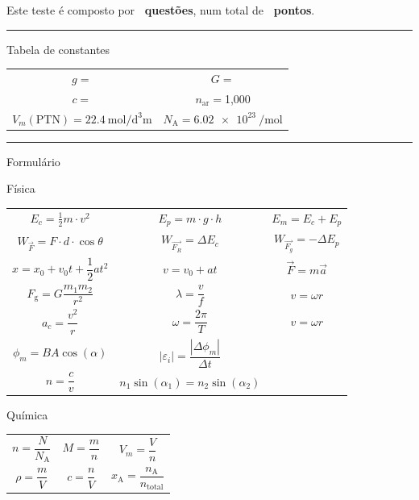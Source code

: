 \vspace{0.5cm}
Este teste é composto por \textbf{\numquestions\ questões}, num total de \textbf{\numpoints\ pontos}.

\par\noindent\rule{\textwidth}{0.4pt}

\vspace{10pt}
{\Large Tabela de constantes}

\begin{center}
	\begin{tabular}{c|c}
		
		$g = $ \kAccelGravity & $ G = $ \kGravity \\
		 $c = $ \kSpeedLight & $n_\text{ar} = $1,000\\
		 $V_m(\text{PTN}) = \SI{22,4}{\mole\per\cubic\deci\meter}$ & $N_\text{A} = \SI{6,02e23}{\per\mole}$\\
		
	\end{tabular}
\end{center}

\par\noindent\rule{\textwidth}{0.4pt}

\vspace{10pt}
{\Large Formulário}

\begin{center}
	Física\\
	\begin{tabular}{|ccc|}
		
		\hline
		$E_c = \frac{1}{2} m \cdot v^2$ & $ E_p = m \cdot g \cdot h $ & $E_m = E_c + E_p$\\
		$W_{\vec{F}} = F \cdot d \cdot \cos \theta$ & $W_{\vec{F_R}} = \Delta E_c$ & $W_{\vec{F_g}} = - \Delta E_p$\\
		$x = x_0 + v_0 t + \dfrac{1}{2} a t^2$ & $v = v_0 + a t$ & $\vec{F} = m \vec{a}$\\
		$F_{\text{g}} = G \dfrac{m_1 m_2}{r^2}$ & $\lambda = \dfrac{v}{f}$& $v=\omega r$\\
		$a_c = \dfrac{v^2}{r}$ & $\omega = \dfrac{2\pi}{T}$ & $v = \omega r$\\
		$\phi_m= B A \cos(\alpha)$ & $|\varepsilon_i| = \dfrac{|\Delta \phi_m|}{\Delta t}$ & \\
		$n=\dfrac{c}{v}$ & $n_1 \sin(\alpha_1) = n_2 \sin(\alpha_2)$ & \\
		\hline
		
	\end{tabular}
	
	Química\\
	\begin{tabular}{|ccc|}
		
		\hline
		$n = \dfrac{N}{N_\text{A}}$ & $M = \dfrac{m}{n}$ & $V_m = \dfrac{V}{n}$\\
		$\rho = \dfrac{m}{V}$&$c = \dfrac{n}{V}$&$x_\text{A} = \dfrac{n_\text{A}}{n_\text{total}}$\\
		\hline
		
	\end{tabular}
\end{center}

